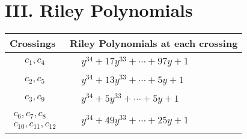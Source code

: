 \documentclass[1p]{elsarticle_modified}
\theoremstyle{definition}
\begin{document}
\centering \section*{ III. Riley Polynomials}
\begin{tabular}{m{50pt}|m{274pt}}
Crossings & \hspace{64pt}Riley Polynomials at each crossing \\
\hline $$\begin{aligned}c_{1},c_{4}\end{aligned}$$&$\begin{aligned}
&y^{34}+17 y^{33}+\cdots+97 y+1
\end{aligned}$\\
\hline $$\begin{aligned}c_{2},c_{5}\end{aligned}$$&$\begin{aligned}
&y^{34}+13 y^{33}+\cdots+5 y+1
\end{aligned}$\\
\hline $$\begin{aligned}c_{3},c_{9}\end{aligned}$$&$\begin{aligned}
&y^{34}+5 y^{33}+\cdots+5 y+1
\end{aligned}$\\
\hline $$\begin{aligned}c_{6},c_{7},c_{8}\\c_{10},c_{11},c_{12}\end{aligned}$$&$\begin{aligned}
&y^{34}+49 y^{33}+\cdots+25 y+1
\end{aligned}$\\
\hline
\end{tabular}
\vskip 2pc
\end{document}
